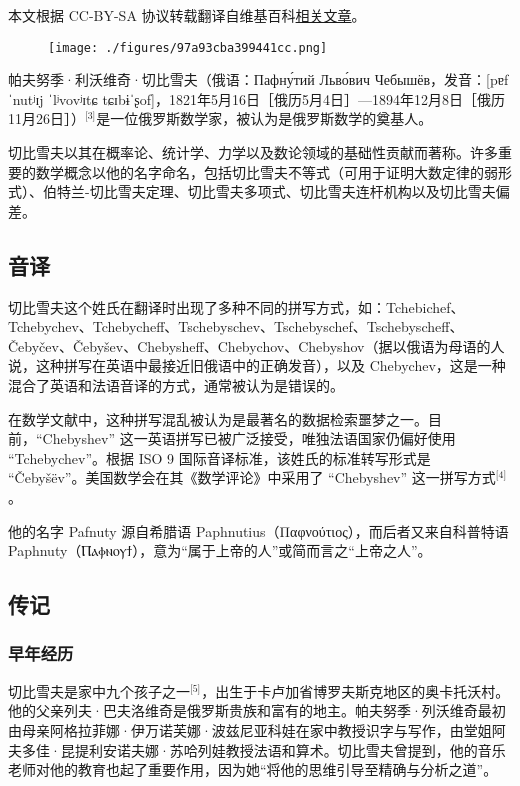 
本文根据 CC-BY-SA 协议转载翻译自维基百科\href{https://en.wikipedia.org/wiki/Pafnuty_Chebyshev}{相关文章}。

\begin{figure}[ht]
\centering
\texttt{[image: ./figures/97a93cba399441cc.png]}
\caption{} \label{fig_PFNJ_1}
\end{figure}
帕夫努季·利沃维奇·切比雪夫（俄语：Пафну́тий Льво́вич Чебышёв，发音：[pɐfˈnutʲɪj ˈlʲvovʲɪtɕ tɕɪbɨˈʂof]，1821年5月16日［俄历5月4日］—1894年12月8日［俄历11月26日］）\(^\text{[3]}\)是一位俄罗斯数学家，被认为是俄罗斯数学的奠基人。

切比雪夫以其在概率论、统计学、力学以及数论领域的基础性贡献而著称。许多重要的数学概念以他的名字命名，包括切比雪夫不等式（可用于证明大数定律的弱形式）、伯特兰-切比雪夫定理、切比雪夫多项式、切比雪夫连杆机构以及切比雪夫偏差。
\subsection{音译}
切比雪夫这个姓氏在翻译时出现了多种不同的拼写方式，如：Tchebichef、Tchebychev、Tchebycheff、Tschebyschev、Tschebyschef、Tschebyscheff、Čebyčev、Čebyšev、Chebysheff、Chebychov、Chebyshov（据以俄语为母语的人说，这种拼写在英语中最接近旧俄语中的正确发音），以及 Chebychev，这是一种混合了英语和法语音译的方式，通常被认为是错误的。

在数学文献中，这种拼写混乱被认为是最著名的数据检索噩梦之一。目前，“Chebyshev” 这一英语拼写已被广泛接受，唯独法语国家仍偏好使用 “Tchebychev”。根据 ISO 9 国际音译标准，该姓氏的标准转写形式是 “Čebyšëv”。美国数学会在其《数学评论》中采用了 “Chebyshev” 这一拼写方式\(^\text{[4]}\)。

他的名字 Pafnuty 源自希腊语 Paphnutius（Παφνούτιος），而后者又来自科普特语 Paphnuty（Ⲡⲁⲫⲛⲟⲩϯ），意为“属于上帝的人”或简而言之“上帝之人”。
\subsection{传记}
\subsubsection{早年经历}
切比雪夫是家中九个孩子之一\(^\text{[5]}\)，出生于卡卢加省博罗夫斯克地区的奥卡托沃村。他的父亲列夫·巴夫洛维奇是俄罗斯贵族和富有的地主。帕夫努季·列沃维奇最初由母亲阿格拉菲娜·伊万诺芙娜·波兹尼亚科娃在家中教授识字与写作，由堂姐阿夫多佳·昆提利安诺夫娜·苏哈列娃教授法语和算术。切比雪夫曾提到，他的音乐老师对他的教育也起了重要作用，因为她“将他的思维引导至精确与分析之道”。

